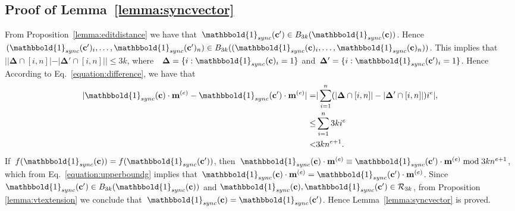 \documentclass[10pt,a4paper,onecolumn]{IEEEtran}
\newcommand{\1}{\mathbbold{1}}
\newcommand{\boldc}{\mathbf{c}}
\newcommand{\boldm}{\mathbf{m}}
\begin{document}
\subsection{Proof of Lemma~\ref{lemma:syncvector}}\label{subsection:proofoflemma1}
From Proposition~\ref{lemma:editdistance} we have that~$\1_{sync}(\boldc')\in B_{3k}(\1_{sync}(\boldc))$. Hence~$(\1_{sync}(\boldc')_i,\ldots,\1_{sync}(\boldc')_n)\in B_{3k}((\1_{sync}(\boldc)_i,\ldots,\1_{sync}(\boldc)_n))$. 
This implies that~$||\boldsymbol{\Delta}\cap[i,n]|-|\boldsymbol{\Delta}'\cap[i,n]||\le 3k$, where~~$\boldsymbol{\Delta}=\{i:\1_{sync}(\boldc)_i=1\}$ and~$\boldsymbol{\Delta}'=\{i:\1_{sync}(\boldc')_i=1\}$. Hence According to Eq.~\eqref{equation:difference}, we have that
\begin{align}\label{equation:upperboundg}
    |\1_{sync}( \boldc) \cdot \boldm^{(e)}- \1_{sync}(\boldc') \cdot  \boldm^{(e)}| =&|\sum^n_{i=1}(|\boldsymbol{\Delta}\cap[i,n]|-|\boldsymbol{\Delta}'\cap[i,n]|)i^e|,\nonumber\\
    \le&\sum^n_{i=1}3ki^e\nonumber\\
    <& 3kn^{e+1}.
\end{align}
If~$f(\1_{sync}(\boldc))=f(\1_{sync}(\boldc'))$, then~$\1_{sync}( \boldc) \cdot \boldm^{(e)}\equiv \1_{sync}(\boldc') \cdot  \boldm^{(e)} \bmod{3kn^{e+1}}$, which from Eq.~\eqref{equation:upperboundg} implies that~$\1_{sync}( \boldc) \cdot \boldm^{(e)}= \1_{sync}(\boldc') \cdot  \boldm^{(e)}$.  Since~$\1_{sync}(\boldc')\in B_{3k}(\1_{sync}(\boldc))$ and $\1_{sync}(\boldc),\1_{sync}(\boldc')\in\mathcal{R}_{3k}$, from Proposition \ref{lemma:vtextension} we conclude that~$\1_{sync}(\boldc)=\1_{sync}(\boldc')$. Hence Lemma~\ref{lemma:syncvector} is proved.
\end{document}
